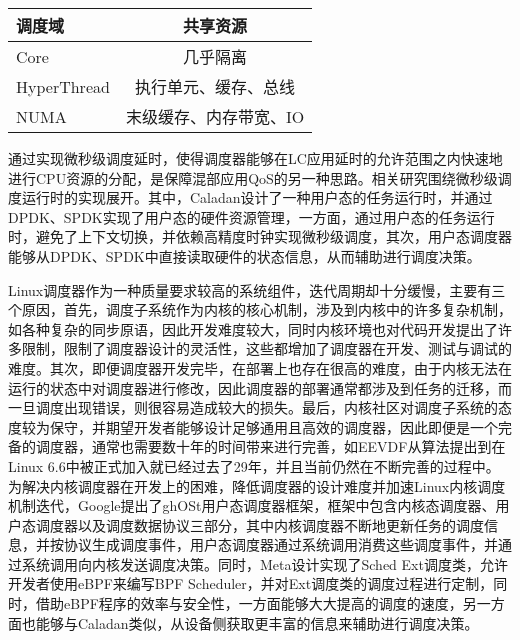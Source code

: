 \begin{table}[!htbp]
    \label{tab:resourcesharing}
    \footnotesize%
    \setlength{\tabcolsep}{4pt}%
    \renewcommand{\arraystretch}{1.5}%
    \centering
    \begin{tabular}{lc}
        \hline
        调度域 & 共享资源\\
        \hline
        Core & 几乎隔离\\
        HyperThread & 执行单元、缓存、总线\\
        NUMA & 末级缓存、内存带宽、IO\\
        \hline
    \end{tabular}
\end{table}

通过实现微秒级调度延时，使得调度器能够在LC应用延时的允许范围之内快速地进行CPU资源的分配，是保障混部应用QoS的另一种思路。相关研究围绕微秒级调度运行时的实现\citep{ousterhout2019shenango,fried2020caladan,prekas2017zygos}展开。其中，Caladan\citep{fried2020caladan}设计了一种用户态的任务运行时，并通过DPDK、SPDK实现了用户态的硬件资源管理，一方面，通过用户态的任务运行时，避免了上下文切换，并依赖高精度时钟实现微秒级调度，其次，用户态调度器能够从DPDK、SPDK中直接读取硬件的状态信息，从而辅助进行调度决策。

Linux调度器作为一种质量要求较高的系统组件，迭代周期却十分缓慢，主要有三个原因，首先，调度子系统作为内核的核心机制，涉及到内核中的许多复杂机制，如各种复杂的同步原语，因此开发难度较大，同时内核环境也对代码开发提出了许多限制，限制了调度器设计的灵活性，这些都增加了调度器在开发、测试与调试的难度\citep{humphries2021ghost}。其次，即便调度器开发完毕，在部署上也存在很高的难度，由于内核无法在运行的状态中对调度器进行修改，因此调度器的部署通常都涉及到任务的迁移，而一旦调度出现错误，则很容易造成较大的损失。最后，内核社区对调度子系统的态度较为保守，并期望开发者能够设计足够通用且高效的调度器，因此即便是一个完备的调度器，通常也需要数十年的时间带来进行完善\citep{agache2020firecracker}，如EEVDF从算法提出到在Linux 6.6中被正式加入就已经过去了29年，并且当前仍然在不断完善的过程中。为解决内核调度器在开发上的困难，降低调度器的设计难度并加速Linux内核调度机制迭代，Google提出了ghOSt\citep{humphries2021ghost}用户态调度器框架，框架中包含内核态调度器、用户态调度器以及调度数据协议三部分，其中内核调度器不断地更新任务的调度信息，并按协议生成调度事件，用户态调度器通过系统调用消费这些调度事件，并通过系统调用向内核发送调度决策。同时，Meta设计实现了Sched Ext调度类，允许开发者使用eBPF来编写BPF Scheduler，并对Ext调度类的调度过程进行定制，同时，借助eBPF程序的效率与安全性，一方面能够大大提高的调度的速度，另一方面也能够与Caladan类似，从设备侧获取更丰富的信息来辅助进行调度决策。
 
